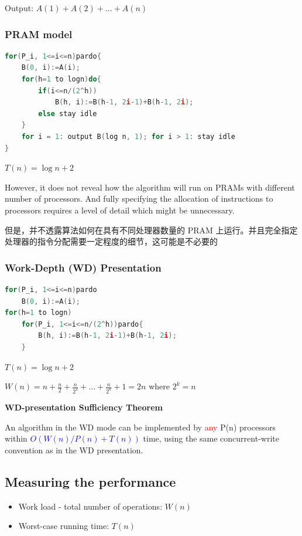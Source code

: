 \documentclass{article}
\begin{document}
Output: $A(1) + A(2) + \dots +A(n)$

\subsubsection{PRAM model}
\begin{lstlisting}[language={c}]
for(P_i, 1<=i<=n)pardo{
    B(0, i):=A(i);
    for(h=1 to logn)do{
        if(i<=n/(2^h))
            B(h, i):=B(h-1, 2i-1)+B(h-1, 2i);
        else stay idle
    }
    for i = 1: output B(log n, 1); for i > 1: stay idle
}
\end{lstlisting}

$T(n)=\log n+2$

However, it does not reveal how the algorithm will run on PRAMs with different number of processors. And fully specifying the allocation of instructions to processors requires a level of detail which might be unnecessary.

但是，并不透露算法如何在具有不同处理器数量的 PRAM 上运行。并且完全指定处理器的指令分配需要一定程度的细节，这可能是不必要的

\subsubsection{Work-Depth (WD) Presentation}
\begin{lstlisting}[language={c}]
for(P_i, 1<=i<=n)pardo
    B(0, i):=A(i);
for(h=1 to logn)
    for(P_i, 1<=i<=n/(2^h))pardo{
        B(h, i):=B(h-1, 2i-1)+B(h-1, 2i);
    }
\end{lstlisting}

$T(n) = \log n + 2$

$W(n) = n + \frac{n}{2} + \frac{n}{2^2} + \dots + \frac{n}{2^k} + 1 = 2n$ where $2^k = n$

\textbf{WD-presentation Sufficiency Theorem}

An algorithm in the WD mode can be implemented by \textcolor{red}{any} P(n) processors within \textcolor{blue}{$O(W(n)/P(n) + T(n))$} time, using the same concurrent-write convention as in the WD presentation.

\subsection{Measuring the performance}
\begin{itemize}
    \item Work load - total number of operations: $W(n)$
    \item Worst-case running time: $T(n)$
\end{itemize}
\end{document}
